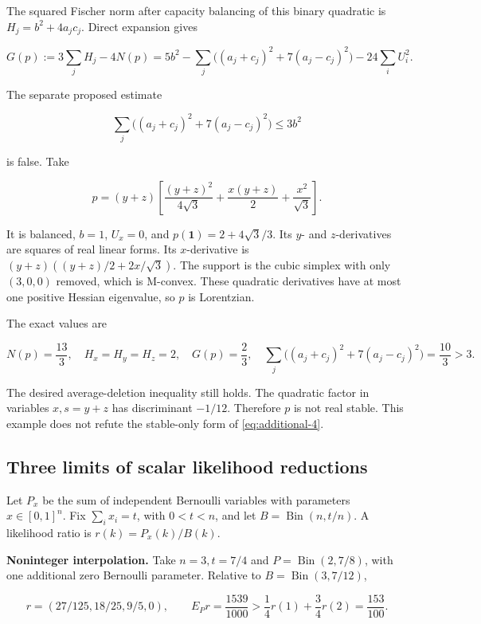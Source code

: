 The squared Fischer norm after capacity balancing of this binary quadratic is \(H_j=b^2+4a_jc_j\). Direct expansion gives

\[
G(p):=3\sum_jH_j-4N(p)
=5b^2-\sum_j\bigl((a_j+c_j)^2+7(a_j-c_j)^2\bigr)-24\sum_iU_i^2.
\]

The separate proposed estimate

\begin{equation}
\sum_j\bigl((a_j+c_j)^2+7(a_j-c_j)^2\bigr)\le3b^2
\label{eq:additional-4}
\end{equation}

is false. Take

\[
p=(y+z)\left[\frac{(y+z)^2}{4\sqrt3}
+\frac{x(y+z)}2+\frac{x^2}{\sqrt3}\right].
\]

It is balanced, \(b=1\), \(U_x=0\), and \(p(\mathbf1)=2+4\sqrt3/3\). Its \(y\)- and \(z\)-derivatives are squares of real linear forms. Its \(x\)-derivative is \((y+z)((y+z)/2+2x/\sqrt3)\). The support is the cubic simplex with only \((3,0,0)\) removed, which is M-convex. These quadratic derivatives have at most one positive Hessian eigenvalue, so \(p\) is Lorentzian.

The exact values are

\[
N(p)=\frac{13}{3},\quad H_x=H_y=H_z=2,\quad
G(p)=\frac23,\quad
\sum_j\bigl((a_j+c_j)^2+7(a_j-c_j)^2\bigr)=\frac{10}{3}>3.
\]

The desired average-deletion inequality still holds. The quadratic factor in variables \(x,s=y+z\) has discriminant \(-1/12\). Therefore \(p\) is not real stable. This example does not refute the stable-only form of \eqref{eq:additional-4}.

\subsection{Three limits of scalar likelihood reductions}\label{app:additional-16}

Let \(P_x\) be the sum of independent Bernoulli variables with parameters \(x\in[0,1]^n\). Fix \(\sum_i x_i=t\), with \(0<t<n\), and let \(B=\operatorname{Bin}(n,t/n)\). A likelihood ratio is \(r(k)=P_x(k)/B(k)\).

\textbf{Noninteger interpolation.} Take \(n=3,t=7/4\) and \(P=\operatorname{Bin}(2,7/8)\), with one additional zero Bernoulli parameter. Relative to \(B=\operatorname{Bin}(3,7/12)\),

\[
r=(27/125,18/25,9/5,0),\qquad
E_Pr=\frac{1539}{1000}>
\frac14r(1)+\frac34r(2)=\frac{153}{100}.
\]

